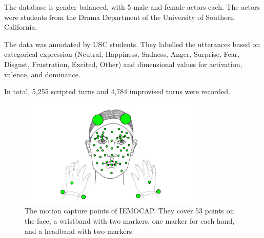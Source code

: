 The database is gender balanced, with 5 male and female actors each. The actors were students from the Drama Department of the University of Southern California.

The data was annotated by USC students. They labelled the utterances based on categorical expression (Neutral, Happiness, Sadness, Anger, Surprise, Fear, Disgust, Frustration, Excited, Other) and dimensional values for activation, valence, and dominance.

In total, 5,255 scripted turns and 4,784 improvised turns were recorded. 

\begin{figure}
    \centering
    \includegraphics[width=0.8\textwidth]{res/iemocap.png}
    \caption{The motion capture points of IEMOCAP. They cover 53 points on the face, a wristband with two markers, one marker for each hand, and a headband with two markers. \cite{busso2008iemocap}}
    \label{fig:iemocap_cap}
\end{figure}
